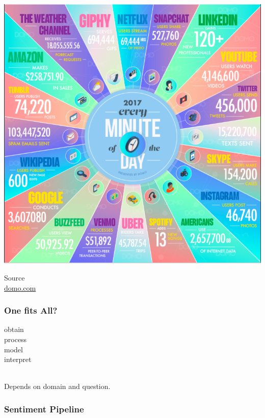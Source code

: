 \begin{frame}[plain]
\hspace*{-32pt}
    \includegraphics[height=\paperheight]{img/figures/data_never_sleeps}
\vspace{-40pt}
\begin{flushright}
Source \\
\textcolor{iseblue}{\href{https://www.domo.com/learn/data-never-sleeps-5?aid=ogsm072517_1&sf100871281=1}{domo.com}}
\end{flushright}
\end{frame}

\begin{frame}
    \frametitle{One fits All?}
\begin{minipage}[t]{\textwidth}
\begin{minipage}[c]{.3\textwidth}
\end{minipage}%
\begin{minipage}[c]{.2\textwidth}
    {\Large
        obtain \\[0.4\baselineskip]
        process \\[0.4\baselineskip]
        model \\[0.4\baselineskip]
        interpret \\[0.4\baselineskip]
    }
\end{minipage}%
\begin{minipage}[c]{.2\textwidth}
\end{minipage}%
\begin{minipage}[c]{.2\textwidth}
\end{minipage}
\end{minipage} \\
\vspace{20pt}
Depends on domain and question.
\end{frame}

\begin{frame}
    \frametitle{Sentiment Pipeline}
    \scalebox{0.78}{
        
    }
\end{frame}